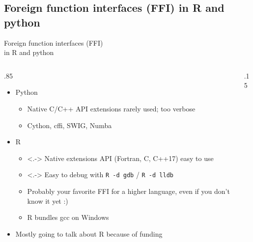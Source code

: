 \documentclass[
aspectratio=169,
xcolor={usenames}
]{beamer}
\begin{document}
\subsection{Foreign function interfaces (FFI) in R and python}
\begin{frame}{\hspace{8cm}Foreign function interfaces (FFI)\\%
    \hspace{8cm}in R and python}
  \begin{columns}[T]
    \begin{column}{.85\framewidth}
      \begin{itemize}[<+->]
      \item Python
        \begin{itemize}[<.->]
        \item Native C/C++ API extensions rarely used; too verbose
        \item Cython, cffi, SWIG, Numba
        \end{itemize}
      \item R
        \begin{itemize}
        \item<.-> Native extensions API (Fortran, C, C++17) easy to use%
          \footnotemark[1]
        \item<.-> Easy to debug with \texttt{R -d gdb} / \texttt{R -d lldb}
        \item Probably your favorite FFI for a higher language, %
          even if you don't know it yet :)
        \item R bundles gcc on Windows
        \end{itemize}
      \item Mostly going to talk about R because of funding
      \end{itemize}
    \end{column}
    \begin{column}{.15\framewidth}
\end{column}
\end{columns}
\end{frame}
\end{document}
